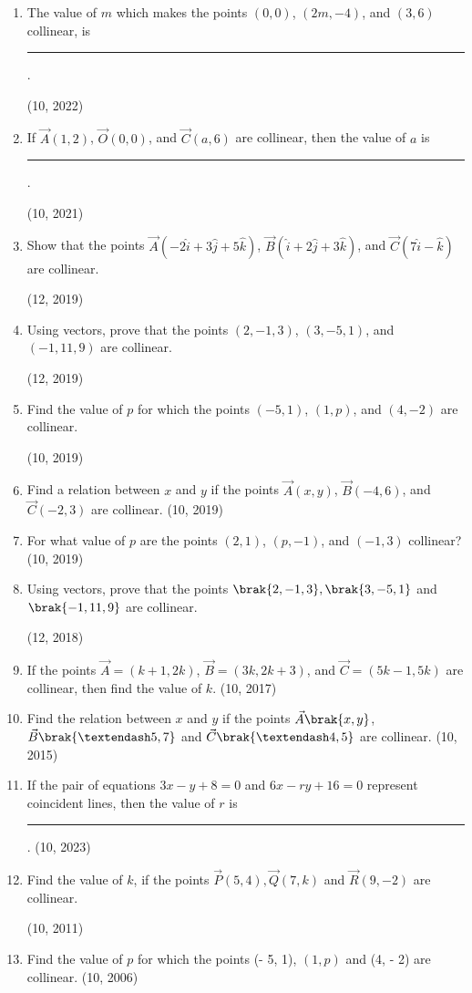 \begin{enumerate}[label=\thesubsection.\arabic*, ref=\thesubsection.\theenumi]
	\item The value of $m$ which makes the points $(0,0)$, $(2m, -4)$, and $(3,6)$ collinear, is \rule{1cm}{0.2pt}.

    \hfill (10, 2022)
		\item If $\vec{A}(1, 2)$, $\vec{O}(0, 0)$, and $\vec{C}(a, 6)$ are collinear, then the value of $a$ is
\rule{1cm}{0.2pt}.

		\hfill (10, 2021)
	\item Show that the points $\vec{A}(-2\hat{i} + 3\hat{j} + 5\hat{k})$, $\vec{B}(\hat{i} + 2\hat{j} + 3\hat{k})$, and $\vec{C}(7\hat{i} - \hat{k})$ are collinear.

		\hfill (12, 2019)
	\item Using vectors, prove that the points $(2, -1, 3)$, $(3, -5, 1)$, and $(-1, 11, 9)$ are collinear.

		\hfill (12, 2019)
\item Find the value of $p$ for which the points $(-5, 1)$, $(1, p)$, and $(4, -2)$ are collinear.

	\hfill (10, 2019)
\item Find a relation between $x$ and $y$ if the points $\vec{A}(x, y)$, $\vec{B}(-4, 6)$, and $\vec{C}(-2, 3)$ are collinear. \hfill (10, 2019)
\item For what value of $p$ are the points $(2, 1)$, $(p, -1)$, and $(-1, 3)$ collinear? \hfill (10, 2019)
\item Using vectors, prove that the points $\brak{2,-1,3},\brak{3,-5,1}$ and $\brak{-1,11,9}$ are collinear.

\hfill (12, 2018) 
\item If the points $\vec{A} = (k+1, 2k)$, $\vec{B} = (3k, 2k + 3)$, and $\vec{C} = (5k-1, 5k)$ are collinear, then find the value of $k$. \hfill (10, 2017)
\item Find the relation between $x$ and $y$ if the points $\vec{A}\brak{x,y}$, $\vec{B}\brak{–5,7}$ and $\vec{C}\brak{–4, 5}$ are collinear. \hfill (10, 2015)
  \item If the pair of equations $3x-y+8=0$ and $6x-ry+16=0$ represent coincident lines, then the value of $r$ is
\rule{1cm}{0.2pt}.
     \hfill (10, 2023)
    \item Find the value of $k$, if the points $\vec{P}(5,4),\vec{Q}(7,k)$ and $\vec{R}(9,-2)$ are collinear.

\hfill (10, 2011)
\item Find the value of $p$ for which the points (- 5, 1), $(1, p)$ and (4, - 2) are collinear.
\hfill	(10, 2006)
%	
\end{enumerate}
